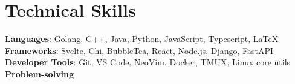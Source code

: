 \documentclass[letterpaper,11pt]{article}
\begin{document}
\section{Technical Skills}
 \begin{itemize}[leftmargin=0.15in, label={}]
    \small{\item{
     \textbf{Languages}{: Golang, C++, Java, Python, JavaScript, Typescript, \LaTeX} \\
     \textbf{Frameworks}{: Svelte, Chi, BubbleTea, React, Node.js, Django, FastAPI} \\
     \textbf{Developer Tools}{: Git, VS Code, NeoVim, Docker, TMUX, Linux core utils} \\
     \textbf{Problem-solving}
    }}
 \end{itemize}


\end{document}
